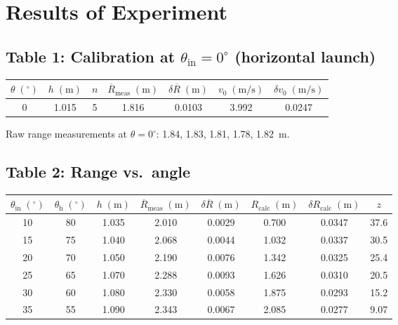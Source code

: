 \documentclass[12pt]{article}
\begin{document}
\section*{Results of Experiment}

\subsection*{Table 1: Calibration at $\theta_{\mathrm{in}} = 0^\circ$ (horizontal launch)}

\begin{table}[H]
\centering
\begin{tabular}{ccccccc}
\toprule
$\theta\;(^\circ)$ & $h\;(\mathrm{m})$ & $n$ & $\overline{R}_{\mathrm{meas}}\;(\mathrm{m})$ & $\delta\overline{R}\;(\mathrm{m})$ & $v_0\;(\mathrm{m/s})$ & $\delta v_0\;(\mathrm{m/s})$ \\
\midrule
0 & 1.015 & 5 & 1.816 & 0.0103 & 3.992 & 0.0247 \\
\bottomrule
\end{tabular}
\end{table}

Raw range measurements at $\theta = 0^\circ$: 1.84, 1.83, 1.81, 1.78, 1.82~m.

\subsection*{Table 2: Range vs.\ angle}

\begin{table}[H]
\centering
\small
\begin{tabular}{cccccccc}
\toprule
$\theta_{\mathrm{in}}\;(^\circ)$ & $\theta_{\mathrm{h}}\;(^\circ)$ & $h\;(\mathrm{m})$ & $\overline{R}_{\mathrm{meas}}\;(\mathrm{m})$ & $\delta\overline{R}\;(\mathrm{m})$ & $R_{\mathrm{calc}}\;(\mathrm{m})$ & $\delta R_{\mathrm{calc}}\;(\mathrm{m})$ & $z$ \\
\midrule
10 & 80 & 1.035 & 2.010 & 0.0029 & 0.700 & 0.0347 & 37.6 \\
15 & 75 & 1.040 & 2.068 & 0.0044 & 1.032 & 0.0337 & 30.5 \\
20 & 70 & 1.050 & 2.190 & 0.0076 & 1.342 & 0.0325 & 25.4 \\
25 & 65 & 1.070 & 2.288 & 0.0093 & 1.626 & 0.0310 & 20.5 \\
30 & 60 & 1.080 & 2.330 & 0.0058 & 1.875 & 0.0293 & 15.2 \\
35 & 55 & 1.090 & 2.343 & 0.0067 & 2.085 & 0.0277 & 9.07 \\
\bottomrule
\end{tabular}
\end{table}
\end{document}
